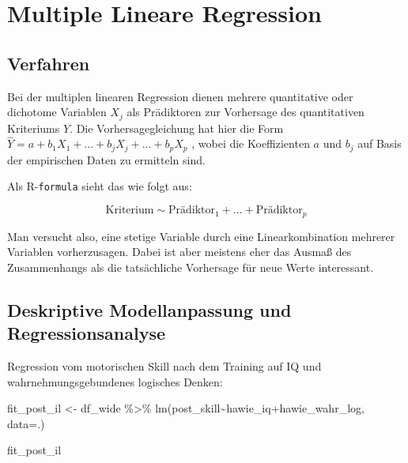 \documentclass[
]{book}
\newenvironment{Shaded}{\begin{snugshade}}{\end{snugshade}}
\newcommand{\AttributeTok}[1]{\textcolor[rgb]{0.77,0.63,0.00}{#1}}
\newcommand{\FunctionTok}[1]{\textcolor[rgb]{0.00,0.00,0.00}{#1}}
\newcommand{\NormalTok}[1]{#1}
\newcommand{\OtherTok}[1]{\textcolor[rgb]{0.56,0.35,0.01}{#1}}
\newcommand{\SpecialCharTok}[1]{\textcolor[rgb]{0.00,0.00,0.00}{#1}}
\begin{document}
\hypertarget{multiple-lineare-regression}{%
\section{Multiple Lineare Regression}\label{multiple-lineare-regression}}

\hypertarget{verfahren}{%
\subsection{Verfahren}\label{verfahren}}

Bei der multiplen linearen Regression dienen mehrere quantitative oder dichotome Variablen
\(X_j\) als Prädiktoren zur Vorhersage des quantitativen Kriteriums \(Y\). Die Vorhersagegleichung
hat hier die Form \(\hat{Y} = a + b_1 X_1 + ... + b_j X_ j + ... + b_p X_p\) , wobei die Koeffizienten \(a\) und \(b_j\) auf Basis der empirischen Daten zu ermitteln sind.

Als R-\texttt{formula} sieht das wie folgt aus:

\[\text{Kriterium} \sim \text{Prädiktor}_1 + \dots + \text{Prädiktor}_p\]

Man versucht also, eine stetige Variable durch eine Linearkombination mehrerer Variablen vorherzusagen. Dabei ist aber meistens eher das Ausmaß des Zusammenhangs als die tatsächliche Vorhersage für neue Werte interessant.

\hypertarget{deskriptive-modellanpassung-und-regressionsanalyse}{%
\subsection{Deskriptive Modellanpassung und Regressionsanalyse}\label{deskriptive-modellanpassung-und-regressionsanalyse}}

Regression vom motorischen Skill nach dem Training auf IQ und wahrnehmungsgebundenes logisches Denken:

\begin{Shaded}
\begin{Highlighting}[]
\NormalTok{fit\_post\_il }\OtherTok{\textless{}{-}}\NormalTok{ df\_wide }\SpecialCharTok{\%\textgreater{}\%} 
   \FunctionTok{lm}\NormalTok{(post\_skill}\SpecialCharTok{\textasciitilde{}}\NormalTok{hawie\_iq}\SpecialCharTok{+}\NormalTok{hawie\_wahr\_log, }
      \AttributeTok{data=}\NormalTok{.)}

\NormalTok{fit\_post\_il}
\end{Highlighting}
\end{Shaded}
\end{document}
